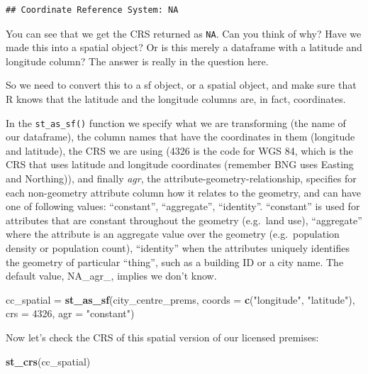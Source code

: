 \documentclass[]{book}
\newenvironment{Shaded}{\begin{snugshade}}{\end{snugshade}}
\newcommand{\DataTypeTok}[1]{\textcolor[rgb]{0.13,0.29,0.53}{#1}}
\newcommand{\DecValTok}[1]{\textcolor[rgb]{0.00,0.00,0.81}{#1}}
\newcommand{\KeywordTok}[1]{\textcolor[rgb]{0.13,0.29,0.53}{\textbf{#1}}}
\newcommand{\NormalTok}[1]{#1}
\newcommand{\StringTok}[1]{\textcolor[rgb]{0.31,0.60,0.02}{#1}}
\begin{document}
\begin{verbatim}
## Coordinate Reference System: NA
\end{verbatim}

You can see that we get the CRS returned as \texttt{NA}. Can you think of why? Have we made this into a spatial object? Or is this merely a dataframe with a latitude and longitude column? The answer is really in the question here.

So we need to convert this to a sf object, or a spatial object, and make sure that R knows that the latitude and the longitude columns are, in fact, coordinates.

In the \texttt{st\_as\_sf()} function we specify what we are transforming (the name of our dataframe), the column names that have the coordinates in them (longitude and latitude), the CRS we are using (4326 is the code for WGS 84, which is the CRS that uses latitude and longitude coordinates (remember BNG uses Easting and Northing)), and finally \emph{agr}, the attribute-geometry-relationship, specifies for each non-geometry attribute column how it relates to the geometry, and can have one of following values: ``constant'', ``aggregate'', ``identity''. ``constant'' is used for attributes that are constant throughout the geometry (e.g.~land use), ``aggregate'' where the attribute is an aggregate value over the geometry (e.g.~population density or population count), ``identity'' when the attributes uniquely identifies the geometry of particular ``thing'', such as a building ID or a city name. The default value, NA\_agr\_, implies we don't know.

\begin{Shaded}
\begin{Highlighting}[]
\NormalTok{cc_spatial =}\StringTok{ }\KeywordTok{st_as_sf}\NormalTok{(city_centre_prems, }\DataTypeTok{coords =} \KeywordTok{c}\NormalTok{(}\StringTok{"longitude"}\NormalTok{, }\StringTok{"latitude"}\NormalTok{), }
                 \DataTypeTok{crs =} \DecValTok{4326}\NormalTok{, }\DataTypeTok{agr =} \StringTok{"constant"}\NormalTok{)}
\end{Highlighting}
\end{Shaded}

Now let's check the CRS of this spatial version of our licensed premises:

\begin{Shaded}
\begin{Highlighting}[]
\KeywordTok{st_crs}\NormalTok{(cc_spatial)}
\end{Highlighting}
\end{Shaded}
\end{document}

